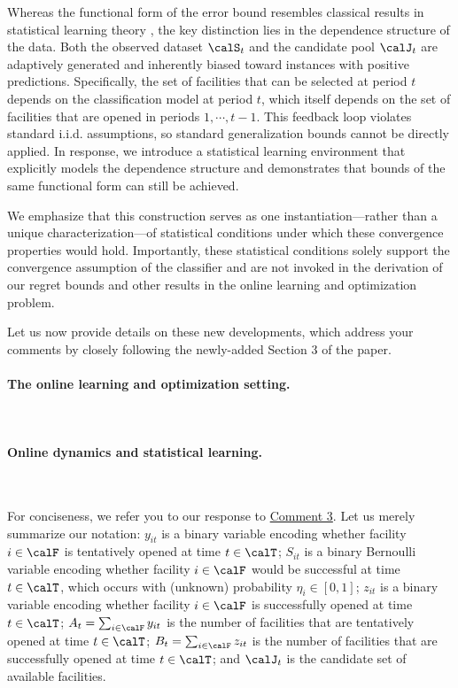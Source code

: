 \documentclass[11pt]{article}
\begin{document}
Whereas the functional form of the error bound resembles classical results in statistical learning theory \citep{boucheron2005theory, vapnik2015uniform, bousquet2002stability, feldman2019high}, the key distinction lies in the dependence structure of the data. Both the observed dataset $\calS_t$ and the candidate pool $\calJ_t$ are adaptively generated and inherently biased toward instances with positive predictions. Specifically, the set of facilities that can be selected at period $t$ depends on the classification model at period $t$, which itself depends on the set of facilities that are opened in periods $1,\cdots,t-1$. This feedback loop violates standard i.i.d. assumptions, so standard generalization bounds cannot be directly applied. In response, we introduce a statistical learning environment that explicitly models the dependence structure and demonstrates that bounds of the same functional form can still be achieved.

We emphasize that this construction serves as one instantiation—rather than a unique characterization—of statistical conditions under which these convergence properties would hold. Importantly, these statistical conditions solely support the convergence assumption of the classifier and are not invoked in the derivation of our regret bounds and other results in the online learning and optimization problem.

Let us now provide details on these new developments, which address your comments by closely following the newly-added Section 3 of the paper.

\paragraph{The online learning and optimization setting.}\

\paragraph{Online dynamics and statistical learning.}\

For conciseness, we refer you to our response to \hyperref[R2:3]{\color{blue}Comment 3}. Let us merely summarize our notation: $y_{it}$ is a binary variable encoding whether facility $i\in\calF$ is tentatively opened at time $t\in\calT$; $S_{it}$ is a binary Bernoulli variable encoding whether facility $i\in\calF$ would be successful at time $t\in\calT$, which occurs with (unknown) probability $\eta_{i}\in[0,1]$; $z_{it}$ is a binary variable encoding whether facility $i\in\calF$ is successfully opened at time $t\in\calT$; $A_t=\sum_{i\in\calF}y_{it}$ is the number of facilities that are tentatively opened at time $t\in\calT$; $B_t=\sum_{i\in\calF}z_{it}$ is the number of facilities that are successfully opened at time $t\in\calT$; and $\calJ_t$ is the candidate set of available facilities.
\end{document}
